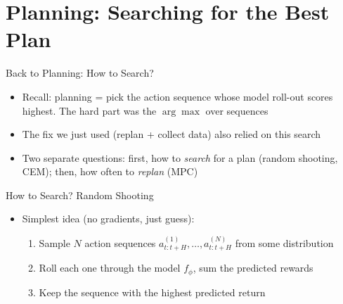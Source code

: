 \section{Planning: Searching for the Best Plan}

\begin{frame}{Back to Planning: How to Search?}
\begin{itemize}
    \item Recall: planning = pick the action sequence whose model roll-out scores
          highest. The hard part was the $\arg\max$ over sequences
    \item The fix we just used (replan + collect data) also relied on this search
    \item Two separate questions: first, how to \emph{search} for a plan (random
          shooting, CEM); then, how often to \emph{replan} (MPC)
\end{itemize}
\end{frame}

\begin{frame}{How to Search? Random Shooting}
\begin{itemize}
    \item Simplest idea (no gradients, just guess):
    \begin{enumerate}
        \item Sample $N$ action sequences $a_{t:t+H}^{(1)}, \dots, a_{t:t+H}^{(N)}$
              from some distribution
        \item Roll each one through the model $f_\phi$, sum the predicted rewards
        \item Keep the sequence with the highest predicted return
    \end{enumerate}
\end{itemize}
\end{frame}

